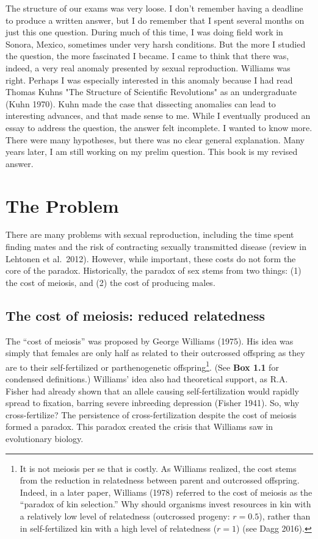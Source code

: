 \documentclass[
  letterpaper,
]{scrbook}
\begin{document}
The structure of our exams was very loose. I don't remember having a
deadline to produce a written answer, but I do remember that I spent
several months on just this one question. During much of this time, I
was doing field work in Sonora, Mexico, sometimes under very harsh
conditions. But the more I studied the question, the more fascinated I
became. I came to think that there was, indeed, a very real anomaly
presented by sexual reproduction. Williams was right. Perhaps I was
especially interested in this anomaly because I had read Thomas
Kuhn\textquotesingle s "The Structure of Scientific Revolutions" as an
undergraduate (Kuhn 1970). Kuhn made the case that dissecting anomalies
can lead to interesting advances, and that made sense to me. While I
eventually produced an essay to address the question, the answer felt
incomplete. I wanted to know more. There were many hypotheses, but there
was no clear general explanation. Many years later, I am still working
on my prelim question. This book is my revised answer.

\hypertarget{the-problem}{%
\section{The Problem}\label{the-problem}}

There are many problems with sexual reproduction, including the time
spent finding mates and the risk of contracting sexually transmitted
disease (review in Lehtonen et al.~2012). However, while important,
these costs do not form the core of the paradox. Historically, the
paradox of sex stems from two things: (1) the cost of meiosis, and (2)
the cost of producing males.

\hypertarget{the-cost-of-meiosis-reduced-relatedness}{%
\subsection{The cost of meiosis: reduced
relatedness}\label{the-cost-of-meiosis-reduced-relatedness}}

The ``cost of meiosis'' was proposed by George Williams (1975). His idea
was simply that females are only half as related to their outcrossed
offspring as they are to their self-fertilized or parthenogenetic
offspring\footnote{It is not meiosis per se that is costly. As Williams
  realized, the cost stems from the reduction in relatedness between
  parent and outcrossed offspring. Indeed, in a later paper, Williams
  (1978) referred to the cost of meiosis as the ``paradox of kin
  selection.'' Why should organisms invest resources in kin with a
  relatively low level of relatedness (outcrossed progeny: \(r = 0.5\)),
  rather than in self-fertilized kin with a high level of relatedness
  (\(r = 1\)) (see Dagg 2016).}. (See \textbf{Box 1.1} for condensed
definitions.) Williams' idea also had theoretical support, as R.A.
Fisher had already shown that an allele causing self-fertilization would
rapidly spread to fixation, barring severe inbreeding depression (Fisher
1941). So, why cross-fertilize? The persistence of cross-fertilization
despite the cost of meiosis formed a paradox. This paradox created the
crisis that Williams saw in evolutionary biology.
\end{document}

